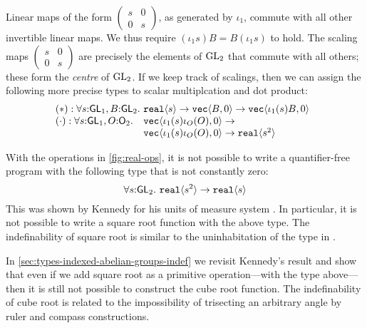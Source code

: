 Linear maps of the form $\left(
  \begin{smallmatrix}s & 0 \\ 0 & s\end{smallmatrix}\right)$, as
generated by $\iota_1$, commute with all other invertible linear
maps. We thus require
$(\iota_1 s)B = B(\iota_1 s)$ to hold.
The scaling maps $\left(
  \begin{smallmatrix}s & 0 \\ 0 & s\end{smallmatrix}\right)$
are precisely the elements of $\mathrm{GL}_2$ that commute with all others;
these form the \emph{centre} of $\mathrm{GL}_2$. If we keep track of
scalings, then we can assign the following more precise types to
scalar multiplcation and dot product:
\begin{displaymath}
\begin{array}{@{}l@{}l}
  (*) : \forall s \mathord: \SynGL{1}, B \mathord:
  \SynGL{2}.\ & \tyPrim{real}{s} \to \tyPrim{vec}{B,0} \to
  \tyPrim{vec}{\iota_1(s)B,0}\\
    (\cdot) : \forall s \mathord: \SynGL{1}, O \mathord: \SynOrth{2}.\ & \tyPrim{vec}{\iota_1(s)\iota_O(O),0} \to\\
    &\tyPrim{vec}{\iota_1(s)\iota_O(O),0} \to \tyPrim{real}{s^2}
  \end{array}
\end{displaymath}

\begin{example}
  With the operations in \autoref{fig:real-ops}, it is not possible to
  write a quantifier-free program with the following type that is not
  constantly zero:
  \begin{displaymath}
    \forall s \mathord: \mathsf{GL}_2.\ \textup{\texttt{real}}\langle s^2 \rangle \to \textup{\texttt{real}}\langle s \rangle
  \end{displaymath}
  This was shown by Kennedy for his units of measure system
  \cite{kennedy97relational}.  In particular, it is not possible to
  write a square root function with the above type.  The
  indefinability of square root is similar to the uninhabitation of the
  type in .

  In \autoref{sec:types-indexed-abelian-groups-indef} we revisit
  Kennedy's result and show that even if we add square root as a
  primitive operation---with the type above---then it is still not
  possible to construct the cube root function. The indefinability of
  cube root is related to the impossibility of trisecting an arbitrary
  angle by ruler and compass constructions.
\end{example}



